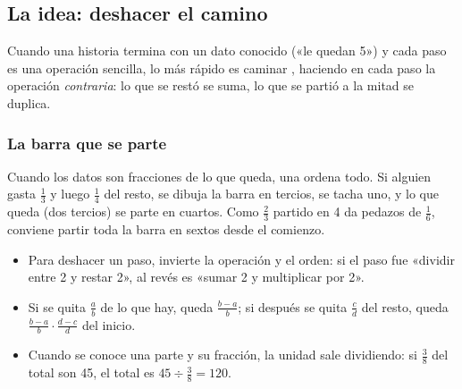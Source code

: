 

\subsection{La idea: deshacer el camino}
Cuando una historia termina con un dato conocido («le quedan 5») y cada paso es una operación sencilla, lo más rápido
es caminar , haciendo en cada paso la operación \emph{contraria}: lo que se restó se suma,
lo que se partió a la mitad se duplica.


\subsubsection{La barra que se parte}
Cuando los datos son fracciones de lo que queda, una  ordena todo. Si alguien gasta $\tfrac13$ y luego
$\tfrac14$ del resto, se dibuja la barra en tercios, se tacha uno, y lo que queda (dos tercios) se parte en cuartos.
Como $\tfrac23$ partido en 4 da pedazos de $\tfrac16$, conviene partir toda la barra en sextos desde el comienzo.


\begin{regla}
\begin{itemize}
  \item Para deshacer un paso, invierte la operación y el orden: si el paso fue «dividir entre 2 y restar 2», al revés es
  «sumar 2 y multiplicar por 2».
  \item Si se quita $\tfrac ab$ de lo que hay, queda $\tfrac{b-a}{b}$; si después se quita $\tfrac cd$ del resto, queda
  $\tfrac{b-a}{b}\cdot\tfrac{d-c}{d}$ del inicio.
  \item Cuando se conoce una parte y su fracción, la unidad sale dividiendo: si $\tfrac{3}{8}$ del total son 45, el total
  es $45 \div \tfrac38 = 120$.
\end{itemize}
\end{regla}

